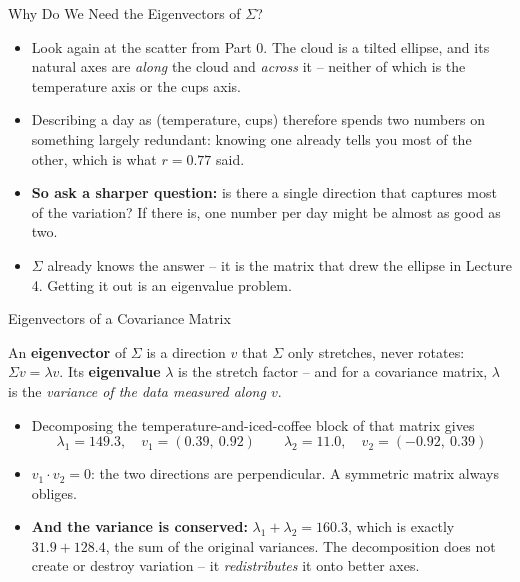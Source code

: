 \begin{frame}{Why Do We Need the Eigenvectors of $\Sigma$?}
\begin{itemize}
  \item Look again at the scatter from Part 0. The cloud is a tilted ellipse, and its natural axes are \emph{along} the cloud and \emph{across} it -- neither of which is the temperature axis or the cups axis.
  \pause
  \item Describing a day as (temperature, cups) therefore spends two numbers on something largely redundant: knowing one already tells you most of the other, which is what $r = 0.77$ said.
  \pause
  \item \textbf{So ask a sharper question:} is there a single direction that captures most of the variation? If there is, one number per day might be almost as good as two.
  \pause
  \item $\Sigma$ already knows the answer -- it is the matrix that drew the ellipse in Lecture 4. Getting it out is an eigenvalue problem.
\end{itemize}
\end{frame}

\begin{frame}{Eigenvectors of a Covariance Matrix}
\begin{rldefinition}
An \textbf{eigenvector} of $\Sigma$ is a direction $v$ that $\Sigma$ only stretches, never rotates: $\Sigma v = \lambda v$. Its \textbf{eigenvalue} $\lambda$ is the stretch factor -- and for a covariance matrix, $\lambda$ is the \emph{variance of the data measured along $v$}.
\end{rldefinition}
\pause
\begin{itemize}
  \item Decomposing the temperature-and-iced-coffee block of that matrix gives
  \[
    \lambda_1 = 149.3,\quad v_1 = (0.39,\ 0.92)
    \qquad
    \lambda_2 = 11.0,\quad v_2 = (-0.92,\ 0.39)
  \]
  \pause
  \item $v_1 \cdot v_2 = 0$: the two directions are perpendicular. A symmetric matrix always obliges.
  \pause
  \item \textbf{And the variance is conserved:} $\lambda_1 + \lambda_2 = 160.3$, which is exactly $31.9 + 128.4$, the sum of the original variances. The decomposition does not create or destroy variation -- it \emph{redistributes} it onto better axes.
\end{itemize}
\end{frame}

